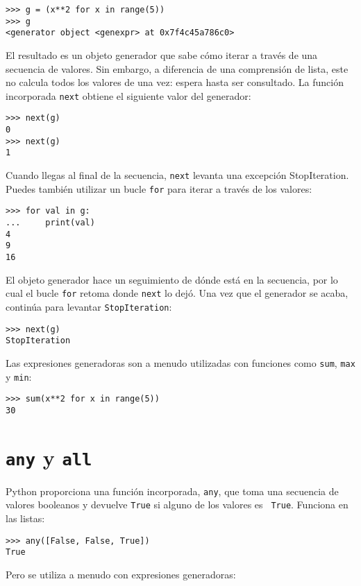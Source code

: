 \documentclass[10pt]{book}
\begin{document}
\begin{verbatim}
>>> g = (x**2 for x in range(5))
>>> g
<generator object <genexpr> at 0x7f4c45a786c0>
\end{verbatim}
%
El resultado es un objeto generador que sabe cómo iterar a través de
una secuencia de valores.  Sin embargo, a diferencia de una comprensión de lista, este no
calcula todos los valores de una vez: espera hasta ser consultado.  La función
incorporada {\tt next} obtiene el siguiente valor del generador:

\begin{verbatim}
>>> next(g)
0
>>> next(g)
1
\end{verbatim}
%
Cuando llegas al final de la secuencia, {\tt next} levanta una
excepción StopIteration.  Puedes también utilizar un bucle {\tt for} para iterar
a través de los valores:

\begin{verbatim}
>>> for val in g:
...     print(val)
4
9
16
\end{verbatim}
%
El objeto generador hace un seguimiento de dónde está en la secuencia,
por lo cual el bucle {\tt for} retoma donde {\tt next} lo dejó.  Una vez que el
generador se acaba, continúa para levantar {\tt StopIteration}:

\begin{verbatim}
>>> next(g)
StopIteration
\end{verbatim}

Las expresiones generadoras son a menudo utilizadas con funciones como {\tt sum},
{\tt max} y {\tt min}:

\begin{verbatim}
>>> sum(x**2 for x in range(5))
30
\end{verbatim}


\section{{\tt any} y {\tt all}}

Python proporciona una función incorporada, {\tt any}, que toma una secuencia
de valores booleanos y devuelve {\tt True} si alguno de los valores es {\tt
  True}.  Funciona en las listas:

\begin{verbatim}
>>> any([False, False, True])
True
\end{verbatim}
%
Pero se utiliza a menudo con expresiones generadoras:
\end{document}
